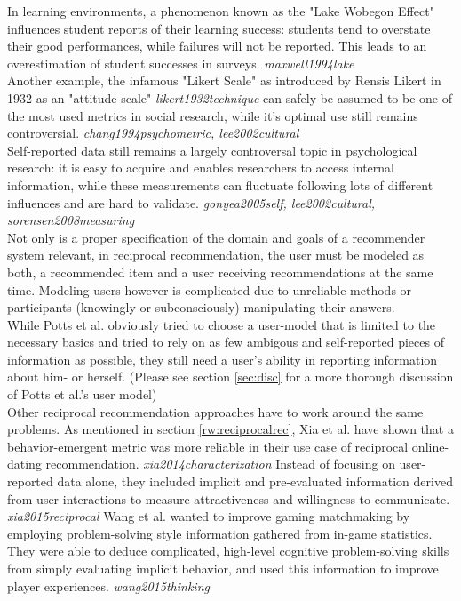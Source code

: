 \documentclass[nochapterpage,bigchapter,linedtoc,longdoc,colorback,accentcolor=tud3b,oneside]{tudreport}
\begin{document}
In learning environments, a phenomenon known as the "Lake Wobegon Effect" influences student reports of their learning success: students tend to overstate their good performances, while failures will not be reported. This leads to an overestimation of student successes in surveys. \textit{maxwell1994lake}\\
Another example, the infamous "Likert Scale" as introduced by Rensis Likert in 1932 as an "attitude scale" \textit{likert1932technique} can safely be assumed to be one of the most used metrics in social research, while it's optimal use still remains controversial. \textit{chang1994psychometric, lee2002cultural}\\
Self-reported data still remains a largely controversal topic in psychological research: it is easy to acquire and enables researchers to access internal information, while these measurements can fluctuate following lots of different influences and are hard to validate. \textit{gonyea2005self, lee2002cultural, sorensen2008measuring}\\
Not only is a proper specification of the domain and goals of a recommender system relevant, in reciprocal recommendation, the user must be modeled as both, a recommended item and a user receiving recommendations at the same time. Modeling users however is complicated due to unreliable methods or participants (knowingly or subconsciously) manipulating their answers.\\
While Potts et al. obviously tried to choose a user-model that is limited to the necessary basics and tried to rely on as few ambigous and self-reported pieces of information as possible, they still need a user's ability in reporting information about him- or herself. (Please see section \ref{sec:disc} for a more thorough discussion of Potts et al.'s user model)\\
Other reciprocal recommendation approaches have to work around the same problems. As mentioned in section \ref{rw:reciprocalrec}, Xia et al. have shown that a behavior-emergent metric was more reliable in their use case of reciprocal online-dating recommendation. \textit{xia2014characterization} Instead of focusing on user-reported data alone, they included implicit and pre-evaluated information derived from user interactions to measure attractiveness and willingness to communicate. \textit{xia2015reciprocal} Wang et al. wanted to improve gaming matchmaking by employing problem-solving style information gathered from in-game statistics. They were able to deduce complicated, high-level cognitive problem-solving skills from simply evaluating implicit behavior, and used this information to improve player experiences. \textit{wang2015thinking}\\
\end{document}
